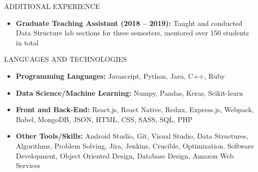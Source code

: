 \documentclass[]{mcdowellcv}
\begin{document}
	\begin{cvsection}{ADDITIONAL EXPERIENCE}
		\begin{cvsubsection}{}{}{}	
			\begin{itemize}
				\item \textbf{Graduate Teaching Assistant (2018 – 2019):} Taught and conducted Data Structure lab sections for three semesters, mentored over 150 students in total
			\end{itemize}
		\end{cvsubsection}
	\end{cvsection}
	
	\begin{cvsection}{LANGUAGES AND TECHNOLOGIES}
		\begin{cvsubsection}{}{}{}	
			\begin{itemize}
				\item \textbf{Programming Languages:} Javascript, Python, Java, C++, Ruby
				\item \textbf{Data Science/Machine Learning:} Numpy, Pandas, Keras, Scikit-learn
				\item \textbf{Front and Back-End:} React.js, React Native, Redux, Express.js, Webpack, Babel, MongoDB, JSON, HTML, CSS, SASS, SQL, PHP
				\item \textbf{Other Tools/Skills:} Android Studio, Git, Visual Studio, Data Structures, Algorithms, Problem Solving, Jira, Jenkins, Crucible, Optimization, Software Development, Object Oriented Design, Database Design, Amazon Web Services
			\end{itemize}
		\end{cvsubsection}
	\end{cvsection}
	
\end{document}
